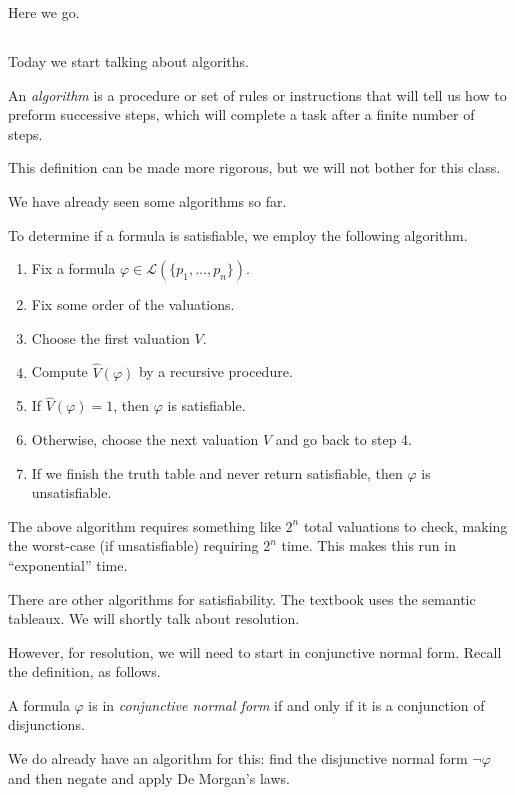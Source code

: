 
Here we go.

\subsection{}
Today we start talking about algoriths.
\begin{definition}[Algorithm]
	An \textit{algorithm} is a procedure or set of rules or instructions that will tell us how to preform successive steps, which will complete a task after a finite number of steps.
\end{definition}
This definition can be made more rigorous, but we will not bother for this class.

We have already seen some algorithms so far.
\begin{example}
	To determine if a formula is satisfiable, we employ the following algorithm.
	\begin{enumerate}
		\item Fix a formula $\varphi\in\mathcal L(\{p_1,\ldots,p_n\})$.
		\item Fix some order of the valuations.
		\item Choose the first valuation $V$.
		\item Compute $\hat V(\varphi)$ by a recursive procedure.
		\item If $\hat V(\varphi)=1$, then $\varphi$ is satisfiable.
		\item Otherwise, choose the next valuation $V$ and go back to step 4.
		\item If we finish the truth table and never return satisfiable, then $\varphi$ is unsatisfiable.
	\end{enumerate}
\end{example}
\begin{remark}
	The above algorithm requires something like $2^n$ total valuations to check, making the worst-case (if unsatisfiable) requiring $2^n$ time. This makes this run in ``exponential'' time.
\end{remark}
\begin{remark}
	There are other algorithms for satisfiability. The textbook uses the semantic tableaux. We will shortly talk about resolution.
\end{remark}
However, for resolution, we will need to start in conjunctive normal form. Recall the definition, as follows.
\begin{definition}
	A formula $\varphi$ is in \textit{conjunctive normal form} if and only if it is a conjunction of disjunctions.
\end{definition}
We do already have an algorithm for this: find the disjunctive normal form $\lnot\varphi$ and then negate and apply De Morgan's laws.

